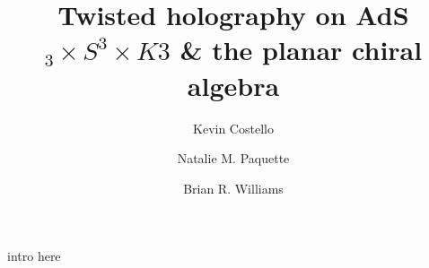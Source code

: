 \documentclass[11pt]{amsart}
\title{Twisted holography on AdS$_3 \times S^3 \times K3$ \& the planar chiral algebra}
\author{Kevin Costello}
\author{Natalie M. Paquette}
\author{Brian R. Williams}
\begin{document}
\maketitle

\begin{abstract} %
\end{abstract}

\tableofcontents

intro here















\end{document}
